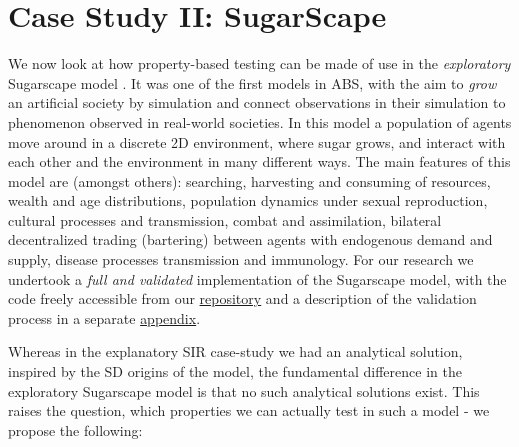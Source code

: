 \section{Case Study II: SugarScape}
\label{sec:case_sug}
We now look at how property-based testing can be made of use in the \textit{exploratory} Sugarscape model \cite{epstein_growing_1996}. It was one of the first models in ABS, with the aim to \textit{grow} an artificial society by simulation and connect observations in their simulation to phenomenon observed in real-world societies. In this model a population of agents move around in a discrete 2D environment, where sugar grows, and interact with each other and the environment in many different ways. The main features of this model are (amongst others): searching, harvesting and consuming of resources, wealth and age distributions, population dynamics under sexual reproduction, cultural processes and transmission, combat and assimilation, bilateral decentralized trading (bartering) between agents with endogenous demand and supply, disease processes transmission and immunology. For our research we undertook a \textit{full and validated} implementation of the Sugarscape model, with the code freely accessible from our \href{https://github.com/thalerjonathan/haskell-sugarscape}{repository} and a description of the validation process in a separate \href{https://github.com/thalerjonathan/phd/blob/master/public/propabs/appendix_validating_sugarscape.pdf}{appendix}. %

Whereas in the explanatory SIR case-study we had an analytical solution, inspired by the SD origins of the model, the fundamental difference in the exploratory Sugarscape model is that no such analytical solutions exist. This raises the question, which properties we can actually test in such a model - we propose the following:

